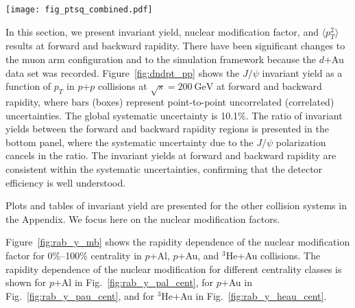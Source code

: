 \documentclass[twocolumn,letterpaper,aps,prc,longbibliography,superscriptaddress,nofootinbib,floatfix]{revtex4-1}
\newcommand{\pt}{\mbox{$p_T$}\xspace}
\newcommand{\Ncoll}{\mbox{$N_{\mathrm coll}$}\xspace}
\newcommand{\meanptsq}{\mbox{$\langle p_T^2 \rangle$}\xspace}
\newcommand{\sqstwo}{\mbox{$\sqrt{s}=200~\mathrm{GeV}$}\xspace}
\newcommand{\pp}{\mbox{$p$$+$$p$}\xspace}
\newcommand{\dau}{\mbox{$d$$+$Au}\xspace}
\newcommand{\pau}{\mbox{$p$$+$Au}\xspace}
\newcommand{\pal}{\mbox{$p$$+$Al}\xspace}
\newcommand{\heau}{\mbox{$^{3}$He$+$Au}\xspace}
\newcommand{\jpsi}{\mbox{$J/\psi$}\xspace}
\begin{document}
\begin{figure*}[htb]
\texttt{[image: fig\_ptsq\_combined.pdf]}
\caption{\label{fig:ptsq_ncoll}
\meanptsq of \jpsi for $\pt<7~\mathrm{GeV}/c$ as a function of $\langle 
\Ncoll \rangle$ for \pal, \pau, and \heau collisions. Bars (boxes) 
around data points represent point-to-point uncorrelated (correlated) 
uncertainties.}
\end{figure*}



In this section, we present invariant yield, nuclear modification 
factor, and \meanptsq results at forward and backward rapidity.
There have been significant changes to the muon arm configuration and to 
the simulation framework because the \dau data set was recorded. 
Figure~\ref{fig:dndpt_pp} shows the \jpsi invariant yield as a function 
of \pt in \pp collisions at \sqstwo at forward and backward rapidity, 
where bars (boxes) represent point-to-point uncorrelated (correlated) 
uncertainties. The global systematic uncertainty is 10.1\%. The ratio of 
invariant yields between the forward and backward rapidity regions is 
presented in the bottom panel, where the systematic uncertainty due to 
the \jpsi polarization cancels in the ratio. The invariant yields at 
forward and backward rapidity are consistent within the systematic 
uncertainties, confirming that the detector efficiency is well 
understood.

Plots and tables of invariant yield are presented for the other 
collision systems in the Appendix. We focus here on the nuclear 
modification factors.


Figure~\ref{fig:rab_y_mb} shows the rapidity dependence of the nuclear 
modification factor for 0\%--100\% centrality in \pal, \pau, and \heau 
collisions. The rapidity dependence of the nuclear modification for 
different centrality classes is shown for \pal in 
Fig.~\ref{fig:rab_y_pal_cent}, for \pau in 
Fig.~\ref{fig:rab_y_pau_cent}, and for \heau in 
Fig.~\ref{fig:rab_y_heau_cent}.
\end{document}
